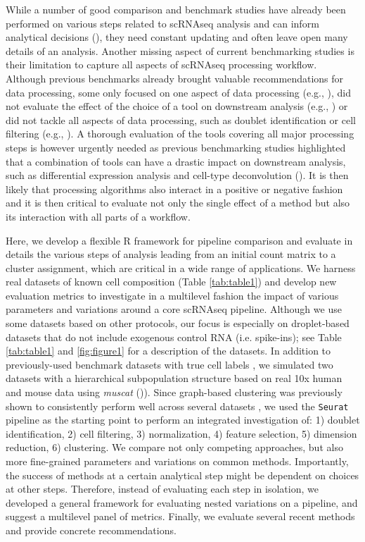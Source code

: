 \documentclass{bmcart}
\begin{document}
While a number of good comparison and benchmark studies have already been performed on various steps related to scRNAseq analysis and can inform analytical decisions (\citealp{duoClustering2018, SonesonDE2018, SunDimRed2019}), they need constant updating and often leave open many details of an analysis. Another missing aspect of current benchmarking studies is their limitation to capture all aspects of scRNAseq processing workflow. Although previous benchmarks already brought valuable recommendations for data processing, some only focused on one aspect of data processing (e.g., \citealp{SunDimRed2019}), did not evaluate the effect of the choice of a tool on downstream analysis (e.g., \citealp{TsuyuzakiPCA2020}) or did not tackle all aspects of data processing, such as doublet identification or cell filtering (e.g., \citealp{viethSystematic2019}). A thorough evaluation of the tools covering all major processing steps is however urgently needed as previous benchmarking studies highlighted that a combination of tools can have a drastic impact on downstream analysis, such as differential expression analysis and cell-type deconvolution (\citealp{viethSystematic2019, CobosDeconvolution2020}). It is then likely that processing algorithms also interact in a positive or negative fashion and it is then critical to evaluate not only the single effect of a method but also its interaction with all parts of a workflow. 

Here, we develop a flexible R framework for pipeline comparison and evaluate in details the various steps of analysis leading from an initial count matrix to a cluster assignment, which are critical in a wide range of applications. We harness real datasets of known cell composition (Table \ref{tab:table1}) and develop new evaluation metrics to investigate in a multilevel fashion the impact of various parameters and variations around a core scRNAseq pipeline. Although we use some datasets based on other protocols, our focus is especially on droplet-based datasets that do not include exogenous control RNA (i.e. spike-ins); see Table \ref{tab:table1} and \ref{fig:figure1} for a description of the datasets. In addition to previously-used benchmark datasets with true cell labels \cite{duoClustering2018,tianMixology2018}, we simulated two datasets with a hierarchical subpopulation structure based on real 10x human and mouse data using \textit{muscat} (\cite{CrowellMuscat2019})). 
Since graph-based clustering \cite{satijaSeurat2015} was previously shown to consistently perform well across several datasets \cite{duoClustering2018,tianMixology2018}, we used the \texttt{Seurat} pipeline as the starting point to perform an integrated investigation of: 1) doublet identification, 2) cell filtering, 3) normalization, 4) feature selection, 5) dimension reduction, 6) clustering. We compare not only competing approaches, but also more fine-grained parameters and variations on common methods. Importantly, the success of methods at a certain analytical step might be dependent on choices at other steps. Therefore, instead of evaluating each step in isolation, we developed a general framework for evaluating nested variations on a pipeline, and suggest a multilevel panel of metrics. Finally, we evaluate several recent methods and provide concrete recommendations.
\end{document}
